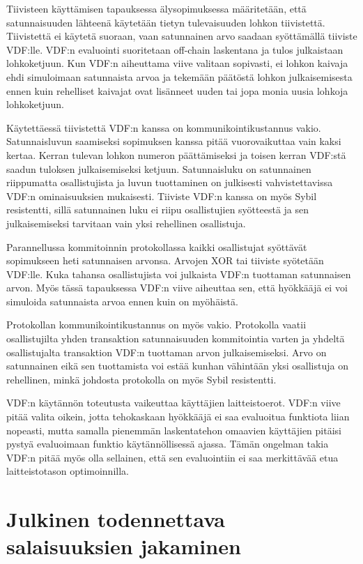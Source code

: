Tiivisteen käyttämisen tapauksessa älysopimuksessa määritetään, että satunnaisuuden lähteenä käytetään tietyn tulevaisuuden lohkon tiivistettä. Tiivistettä ei käytetä suoraan, vaan satunnainen arvo saadaan syöttämällä tiiviste VDF:lle. VDF:n evaluointi suoritetaan off-chain laskentana ja tulos julkaistaan lohkoketjuun. Kun VDF:n aiheuttama viive valitaan sopivasti, ei lohkon kaivaja ehdi simuloimaan satunnaista arvoa ja tekemään päätöstä lohkon julkaisemisesta ennen kuin rehelliset kaivajat ovat lisänneet uuden tai jopa monia uusia lohkoja lohkoketjuun.

Käytettäessä tiivistettä VDF:n kanssa on kommunikointikustannus vakio. Satunnaisluvun saamiseksi sopimuksen kanssa pitää vuorovaikuttaa vain kaksi kertaa. Kerran tulevan lohkon numeron päättämiseksi ja toisen kerran VDF:stä saadun tuloksen julkaisemiseksi ketjuun. Satunnaisluku on satunnainen riippumatta osallistujista ja luvun tuottaminen on julkisesti vahvistettavissa VDF:n ominaisuuksien mukaisesti. Tiiviste VDF:n kanssa on myös Sybil resistentti, sillä satunnainen luku ei riipu osallistujien syötteestä ja sen julkaisemiseksi tarvitaan vain yksi rehellinen osallistuja.

Parannellussa kommitoinnin protokollassa kaikki osallistujat syöttävät sopimukseen heti satunnaisen arvonsa. Arvojen XOR tai tiiviste syötetään VDF:lle. Kuka tahansa osallistujista voi julkaista VDF:n tuottaman satunnaisen arvon. Myös tässä tapauksessa VDF:n viive aiheuttaa sen, että hyökkääjä ei voi simuloida satunnaista arvoa ennen kuin on myöhäistä. 

Protokollan kommunikointikustannus on myös vakio. Protokolla vaatii osallistujilta yhden transaktion satunnaisuuden kommitointia varten ja yhdeltä osallistujalta transaktion VDF:n tuottaman arvon julkaisemiseksi. Arvo on satunnainen eikä sen tuottamista voi estää kunhan vähintään yksi osallistuja on rehellinen, minkä johdosta protokolla on myös Sybil resistentti.

VDF:n käytännön toteutusta vaikeuttaa käyttäjien laitteistoerot. VDF:n viive pitää valita oikein, jotta tehokaskaan hyökkääjä ei saa evaluoitua funktiota liian nopeasti, mutta samalla pienemmän laskentatehon omaavien käyttäjien pitäisi pystyä evaluoimaan funktio käytännöllisessä ajassa. Tämän ongelman takia VDF:n pitää myös olla sellainen, että sen evaluointiin ei saa merkittävää etua laitteistotason optimoinnilla.

\section{Julkinen todennettava salaisuuksien jakaminen}


